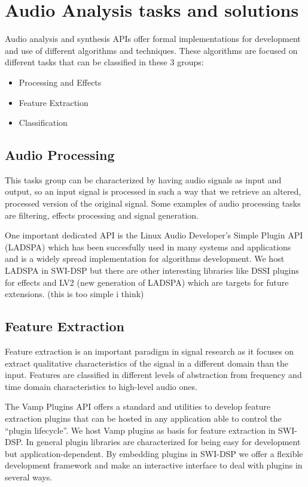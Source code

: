 \documentclass[runningheads]{llncs}
\begin{document}
\section{Audio Analysis tasks and solutions}\label{sec:tasks}

Audio analysis and synthesis APIs offer formal implementations for development and use of different algorithms and techniques. These algorithms are focused on different tasks that can be classified in these 3 groups:

\begin{itemize}
 \item Processing and Effects
 \item Feature Extraction
 \item Classification
\end{itemize}

\subsection{Audio Processing}\label{subsec:effects}

This tasks group can be characterized by having audio signals as input and output, so an input signal is processed in such a way that we retrieve an altered, processed version of the original signal. Some examples of audio processing tasks are filtering, effects processing and signal generation.

One important dedicated API is the Linux Audio Developer's Simple Plugin API (LADSPA) which has been succesfully used in many systems and applications and is a widely spread implementation for algorithms development. We host LADSPA in SWI-DSP but there are other interesting libraries like DSSI plugins for effects and LV2 (new generation of LADSPA) which are targets for future extensions. (this is too simple i think)

\subsection{Feature Extraction}\label{subsec:feature}

Feature extraction is an important paradigm in signal research as it focuses on extract qualitative characteristics of the signal in a different domain than the input. Features are classified in different levels of abstraction from frequency and time domain characteristics to high-level audio ones.

The Vamp Plugins API offers a standard and utilities to develop feature extraction plugins that can be hosted in any application able to control the ``plugin lifecycle''. We host Vamp plugins as basis for feature extraction in SWI-DSP. In general plugin libraries are characterized for being easy for development but application-dependent. By embedding plugins in SWI-DSP we offer a flexible development framework and make an interactive interface to deal with plugins in several ways.
\end{document}
